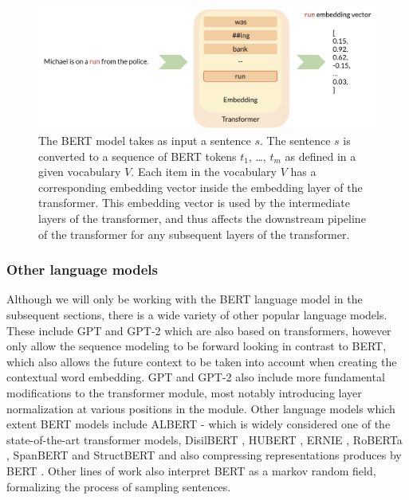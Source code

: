 \documentclass[a4paper,12pt,oneside,openright]{report}
\begin{document}
\begin{figure}[h]
	\center
  \includegraphics[width=\linewidth]{./assets/experiments/pipeline_vanilla_BERT.png}
  \caption{The BERT model takes as input a sentence $s$. The sentence $s$ is converted to a sequence of BERT tokens $t_1$, \ldots, $t_m$ as defined in a given vocabulary $V$.
Each item in the vocabulary $V$ has a corresponding embedding vector inside the embedding layer of the transformer.
This embedding vector is used by the intermediate layers of the transformer, and thus affects the downstream pipeline of the transformer for any subsequent layers of the transformer.
}
  \label{fig:BERT_vanilla_pipeline}
\end{figure}


\subsubsection{Other language models}

Although we will only be working with the BERT language model in the subsequent sections, there is a wide variety of other popular language models.
These include GPT \cite{radford18} and GPT-2 \cite{radford19} which are also based on transformers, however only allow the sequence modeling to be forward looking in contrast to BERT, which also allows the future context to be taken into account when creating the contextual word embedding.
GPT and GPT-2 also include more fundamental modifications to the transformer module, most notably introducing layer normalization \cite{ba16} at various positions in the module. 
Other language models which extent BERT models include ALBERT \cite{lan20} - which is widely considered one of the state-of-the-art transformer models, DisilBERT \cite{sanh19}, HUBERT \cite{moradshahi19}, ERNIE \cite{sun19}, RoBERTa \cite{liu19}, SpanBERT \cite{joshi19} and StructBERT \cite{wang19d} and also compressing representations produces by BERT \cite{shen19}.
Other lines of work \cite{wang19e} also interpret BERT as a markov random field, formalizing the process of sampling sentences.
\end{document}
